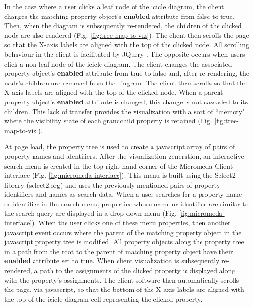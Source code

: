 In the case where a user clicks a leaf node of the icicle diagram, the client 
changes the matching property object's \textbf{enabled} attribute from false to 
true. Then, when the diagram is subsequently re-rendered, the children of the 
clicked node are also rendered (Fig. \ref{fig:tree-map-to-viz}). The client then 
scrolls the page so that the X-axis labels are aligned with the top of the 
clicked node. All scrolling behaviour in the client is facilitated by JQuery 
\cite{li2012jquery}. The opposite occurs when users click a non-leaf node of the 
icicle diagram. The client changes the associated property object's 
\textbf{enabled} attribute from true to false and, after re-rendering, the 
node's children are removed from the diagram. The client then scrolls so that 
the X-axis labels are aligned with the top of the clicked node. When a parent 
property object's \textbf{enabled} attribute is changed, this change is not 
cascaded to its children. This lack of transfer provides the visualization with 
a sort of ``memory" where the visibility state of each grandchild property is 
retained (Fig. \ref{fig:tree-map-to-viz}).

At page load, the property tree is used to create a \gls{javascript} array of 
pairs of property names and identifiers. After the visualization generation, an 
interactive search menu is created in the top right-hand corner of the 
Micromeda-Client interface (Fig. \ref{fig:micromeda-interface}). This menu is 
built using the Select2 library \cite{select2} 
(\href{http://select2.org}{select2.org}) and uses the previously mentioned pairs 
of property identifiers and names as search data. When a user searches for a 
property name or identifier in the search menu, properties whose name or 
identifier are similar to the search query are displayed in a drop-down menu 
(Fig. \ref{fig:micromeda-interface}). When the user clicks one of these menu 
properties, then another \gls{javascript} event occurs where the parent of the 
matching property object in the \gls{javascript} property tree is modified. All 
property objects along the property tree in a path from the root to the parent 
of matching property object have their \textbf{enabled} attribute set to true. 
When client visualization is subsequently re-rendered, a path to the assignments 
of the clicked property is displayed along with the property's assignments. The 
client software then automatically scrolls the page, via \gls{javascript}, so 
that the bottom of the X-axis labels are aligned with the top of the icicle 
diagram cell representing the clicked property.

